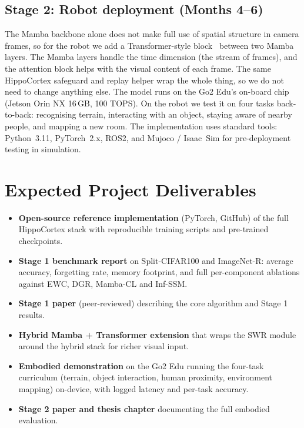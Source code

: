 \documentclass[11pt,a4paper]{article}
\newcommand{\objbold}[1]{\textbf{\color{neuroblue}#1}}
\begin{document}
\subsection{Stage 2: Robot deployment (Months 4--6)}
The Mamba backbone alone does not make full use of spatial structure in camera frames, so for the robot we add a Transformer-style block~\citep{vaswani2017attention} between two Mamba layers. The Mamba layers handle the time dimension (the stream of frames), and the attention block helps with the visual content of each frame. The same HippoCortex safeguard and replay helper wrap the whole thing, so we do not need to change anything else. The model runs on the Go2 Edu's on-board chip (Jetson Orin NX 16\,GB, 100 TOPS). On the robot we test it on four tasks back-to-back: recognising terrain, interacting with an object, staying aware of nearby people, and mapping a new room. The implementation uses standard tools: Python~3.11, PyTorch~2.x, ROS2, and Mujoco / Isaac~Sim for pre-deployment testing in simulation.

\section{Expected Project Deliverables}

\begin{itemize}[leftmargin=1.4em,itemsep=0.0em,topsep=0.05em]
  \item \objbold{Open-source reference implementation} (PyTorch, GitHub) of the full HippoCortex stack with reproducible training scripts and pre-trained checkpoints.
  \item \objbold{Stage 1 benchmark report} on Split-CIFAR100 and ImageNet-R: average accuracy, forgetting rate, memory footprint, and full per-component ablations against EWC, DGR, Mamba-CL and Inf-SSM.
  \item \objbold{Stage 1 paper} (peer-reviewed) describing the core algorithm and Stage 1 results.
  \item \objbold{Hybrid Mamba + Transformer extension} that wraps the SWR module around the hybrid stack for richer visual input.
  \item \objbold{Embodied demonstration} on the Go2 Edu running the four-task curriculum (terrain, object interaction, human proximity, environment mapping) on-device, with logged latency and per-task accuracy.
  \item \objbold{Stage 2 paper and thesis chapter} documenting the full embodied evaluation.
\end{itemize}
\end{document}
